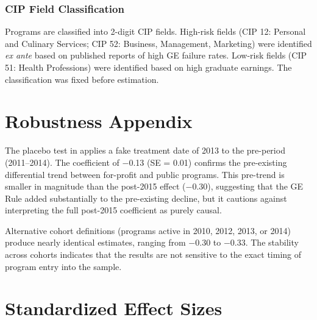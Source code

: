 \documentclass[12pt]{article}
\begin{document}
\subsubsection*{CIP Field Classification} Programs are classified into 2-digit CIP fields. High-risk fields (CIP 12: Personal and Culinary Services; CIP 52: Business, Management, Marketing) were identified \textit{ex ante} based on published reports of high GE failure rates. Low-risk fields (CIP 51: Health Professions) were identified based on high graduate earnings. The classification was fixed before estimation.

\section{Robustness Appendix}

The placebo test in  applies a fake treatment date of 2013 to the pre-period (2011--2014). The coefficient of $-$0.13 (SE = 0.01) confirms the pre-existing differential trend between for-profit and public programs. This pre-trend is smaller in magnitude than the post-2015 effect ($-$0.30), suggesting that the GE Rule added substantially to the pre-existing decline, but it cautions against interpreting the full post-2015 coefficient as purely causal.

Alternative cohort definitions (programs active in 2010, 2012, 2013, or 2014) produce nearly identical estimates, ranging from $-$0.30 to $-$0.33. The stability across cohorts indicates that the results are not sensitive to the exact timing of program entry into the sample.

\section{Standardized Effect Sizes}
\label{sec:sde}


\end{document}
